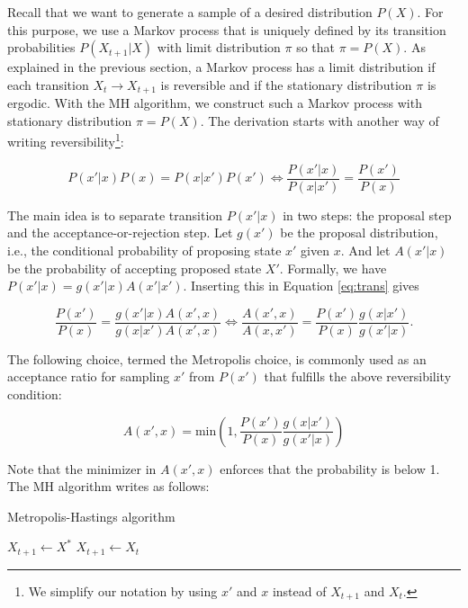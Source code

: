 \documentclass[12pt,english,a4paper,oneside]{article}
\theoremstyle{definition}
\theoremstyle{definition}
\theoremstyle{definition}
\theoremstyle{definition}
\theoremstyle{remark}
\begin{document}
Recall that we want to generate a sample of a desired distribution \(P(X)\). For
this purpose, we use a Markov process that is uniquely defined by its transition probabilities
\(P(X_{t+1}|X)\) with limit distribution \(\pi\) so that \(\pi=P(X)\). As explained in the previous section, a Markov process has a limit distribution if each transition \(X_t \rightarrow X_{t+1}\) is reversible and if the stationary distribution \(\pi\) is ergodic. With the MH algorithm, we construct such a Markov process with stationary distribution \(\pi=P(X)\). The derivation starts
with another way of writing reversibility\footnote{We simplify our notation by using \(x'\) and \(x\) instead of \(X_{t+1}\) and \(X_t\).}:

\begin{equation}
P(x'|x)P(x) = P(x|x')P(x') \iff \frac{P(x'|x)}{P(x|x')} = \frac{P(x')}{P(x)}
\label{eq:trans}
\end{equation}

\noindent
The main idea is to separate transition \(P(x'|x)\) in two steps: the proposal step
and the acceptance-or-rejection step. Let \(g(x')\) be the proposal distribution, i.e.,
the conditional probability of proposing state \(x'\) given \(x\). And let \(A(x'|x)\) be the probability of accepting proposed state \(X'\). Formally, we have
\(P(x'|x)=g(x'|x) A(x'|x')\). Inserting this in Equation \eqref{eq:trans} gives

\begin{equation}
\frac{P(x')}{P(x)} = \frac{g(x'|x)A(x',x)}{g(x|x')A(x',x)} \iff \frac{A(x',x)}{A(x,x')} = \frac{P(x')}{P(x)}\frac{g(x|x')}{g(x'|x)}.
\label{eq:two-steps}
\end{equation}

\noindent
The following choice, termed the Metropolis choice, is commonly used as an acceptance ratio for sampling \(x'\) from \(P(x')\) that fulfills the above reversibility condition:

\begin{equation}
A(x',x) = \text{min}\left( 1, \frac{P(x')}{P(x)}\frac{g(x|x')}{g(x'|x)} \right)
\label{eq:Metropolis-choice}
\end{equation}

\noindent
Note that the minimizer in \(A(x',x)\) enforces that the probability is below 1. The MH algorithm writes as follows:

\begin{algorithm}[H]
\caption{Metropolis-Hastings algorithm}
\begin{algorithmic}

              \State $X_{t+1} \gets X^*$
          \Else
              \State $X_{t+1} \gets X_t$
\EndIf 
        \EndFor   
\end{algorithmic}
\end{algorithm}
\end{document}
